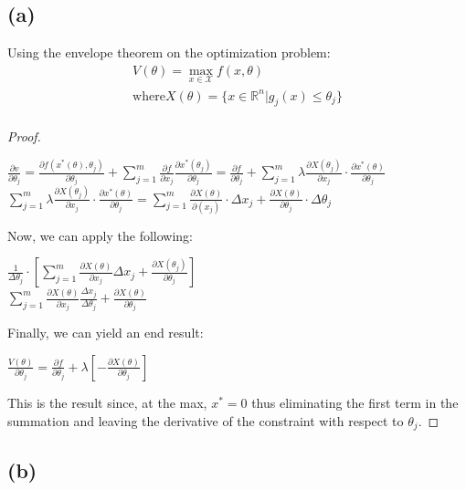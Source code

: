 \documentclass[10pt, a4paper]{article}
\begin{document}
  \subsection*{(a)}
    Using the envelope theorem on the optimization problem:
    \begin{gather*}
      V(\theta)=\max_{x\in\mathcal{X}} f(x,\theta) \\
      \text{where} X(\theta) = \{x\in\mathbb{R}^n|g_j(x)\leq\theta_j\} \\
    \end{gather*}
    \begin{proof}
      \begin{center}
        $\frac{\partial v}{\partial\theta_j} = \frac{\partial f(x^*(\theta),\theta_j)}{\partial\theta_j}
        +\sum\limits_{j=1}^m\frac{\partial f}{\partial x_j}\frac{\partial x^*(\theta_j)}{\partial\theta_j}
        = \frac{\partial f}{\partial\theta_j} + \sum\limits_{j=1}^m\lambda\frac{\partial X(\theta_j)}{\partial x_j}
        \cdot\frac{\partial x^*(\theta)}{\partial\theta_j}$ \\
        $\sum\limits_{j=1}^m\lambda\frac{\partial X(\theta_j)}{\partial x_j}\cdot\frac{\partial x^*(\theta)}{\partial\theta_j}
        = \sum\limits_{j=1}^m\frac{\partial X(\theta)}{\partial(x_j)}\cdot\Delta x_j + \frac{\partial X(\theta)}{\partial\theta_j}\cdot\Delta\theta_j$ \\
      \end{center}
      Now, we can apply the following:
      \begin{center}
        $\frac{1}{\Delta\theta_j}\cdot[\sum\limits_{j=1}^m\frac{\partial X(\theta)}{\partial x_j}\Delta x_j +
        \frac{\partial X(\theta_j)}{\partial\theta_j}]$ \\
        $\sum\limits_{j=1}^m\frac{\partial X(\theta)}{\partial x_j}\frac{\Delta x_j}{\Delta\theta_j} +
        \frac{\partial X(\theta)}{\partial\theta_j}$ \\
      \end{center}
      Finally, we can yield an end result:
      \begin{center}
        $\boxed{\frac{V(\theta)}{\partial\theta_j} = \frac{\partial f}{\partial \theta_j} + \lambda[-\frac{\partial X(\theta)}{\partial\theta_j}]}$
      \end{center}
      This is the result since, at the max, $x^*=0$ thus eliminating the first term in the summation and leaving the derivative of the
      constraint with respect to $\theta_j$.
    \end{proof}
  \subsection*{(b)}
\end{document}
